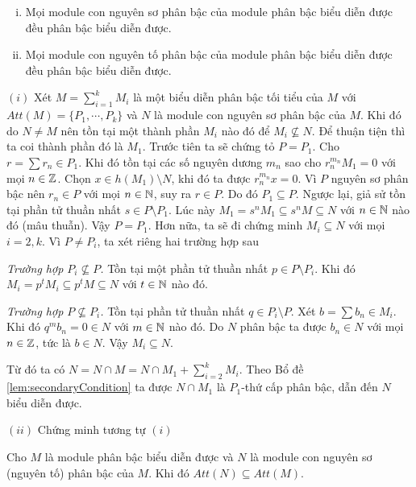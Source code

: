 \begin{theorem}\quad\vspace{-6pt}
    \label{them1}
    \begin{enumerate}[(i)]
        \item Mọi module con nguyên sơ phân bậc của module phân bậc biểu diễn được đều phân bậc biểu diễn được.
        \item Mọi module con nguyên tố phân bậc của module phân bậc biểu diễn được đều phân bậc biểu diễn được.
    \end{enumerate}
\end{theorem}
\startproof $(i)$ Xét $M = \sum_{i=1}^k M_i$ là một biểu diễn phân bậc tối tiểu của $M$ với $Att(M)=\{P_1,\cdots,P_k\}$ và $N$ là module con nguyên sơ phân bậc của $M$. Khi đó do $N \neq M$ nên tồn tại một thành phần $M_i$ nào đó để $M_i \not\subseteq N$. Để thuận tiện thì ta coi thành phần đó là $M_1$. Trước tiên ta sẽ chứng tỏ $P = P_1$. Cho $r = \sum r_n \in P_1$. Khi đó tồn tại các số nguyên dương $m_n$ sao cho $r_n^{m_n}M_1 = 0$ với mọi $n \in \mathbb Z$. Chọn $x \in h(M_1) \setminus N$, khi đó ta được $r_n^{m_n}x = 0$. Vì $P$ nguyên sơ phân bậc nên $r_n \in P$ với mọi $n \in \mathbb N$, suy ra $r \in P$. Do đó $P_1 \subseteq P$. Ngược lại, giả sử tồn tại phần tử thuần nhất $s \in P \setminus P_1$. Lúc này $M_1 = s^nM_1 \subseteq s^nM \subseteq N$ với $n \in \mathbb N$ nào đó (mâu thuẫn). Vậy $P = P_1$. Hơn nữa, ta sẽ đi chứng minh $M_i \subseteq N$ với mọi $i=2,k$. Vì $P \neq P_i$, ta xét riêng hai trường hợp sau

\textit{Trường hợp $P_i \not\subseteq P$.} Tồn tại một phần tử thuần nhất $p \in P \setminus P_i$. Khi đó $M_i = p^tM_i \subseteq p^tM \subseteq N$ với $t \in \mathbb N$ nào đó.

\textit{Trường hợp $P \not\subseteq P_i$.} Tồn tại phần tử thuần nhất $q \in P_i \setminus P$. Xét $b = \sum b_n \in M_i$. Khi đó $q^mb_n = 0 \in N$ với $m \in \mathbb N$ nào đó. Do $N$ phân bậc ta được $b_n \in N$ với mọi $n \in \mathbb Z$, tức là $b \in N$. Vậy $M_i \subseteq N$.

Từ đó ta có $N = N \cap M = N \cap M_1 + \sum_{i=2}^k M_i$. Theo Bổ đề \ref{lem:secondaryCondition} ta được $N \cap M_1$ là $P_1$-thứ cấp phân bậc, dẫn đến $N$ biểu diễn được.

\noindent
$(ii)$ Chứng minh tương tự $(i)$\QED

\begin{corollary}
    Cho $M$ là module phân bậc biểu diễn được và $N$ là module con nguyên sơ (nguyên tố) phân bậc của $M$. Khi đó $Att(N) \subseteq Att(M)$.
\end{corollary}

